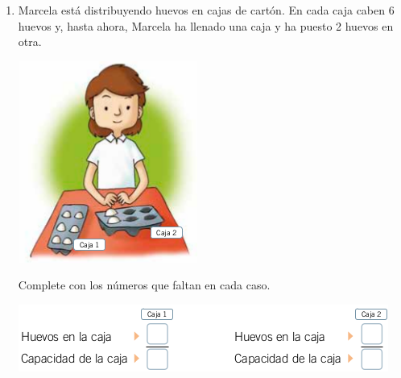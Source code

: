 \documentclass[fleqn]{article}
\begin{document}
\begin{enumerate}
\begin{center}
 \end{center} 
 \noanswer
 \item \begin{minipage}{.6\textwidth}
 Marcela está distribuyendo huevos en cajas de cartón. En cada caja caben 6 huevos y, hasta ahora, Marcela ha llenado una caja y ha puesto 2 huevos en otra.  
 \end{minipage}\hfill
\begin{minipage}{.4\textwidth}
\includegraphics[scale=.4]{Images/Marcela.png} 
\end{minipage}
Complete con los números que faltan en cada caso.
\begin{center}
 \includegraphics[scale=.5]{Images/Huevos.png} 
\end{center}
 \noanswer

 \end{enumerate}
\end{document}
